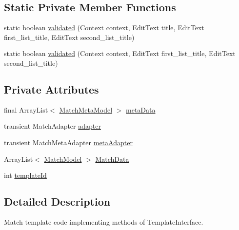 \subsection*{Static Private Member Functions}
\begin{DoxyCompactItemize}
\item 
static boolean \hyperlink{classorg_1_1buildmlearn_1_1toolkit_1_1templates_1_1MatchTemplate_aa835cc39ec0dbc77921db7111300ccc2}{validated} (Context context, Edit\+Text title, Edit\+Text first\+\_\+list\+\_\+title, Edit\+Text second\+\_\+list\+\_\+title)
\item 
static boolean \hyperlink{classorg_1_1buildmlearn_1_1toolkit_1_1templates_1_1MatchTemplate_a32ea6e549a58031b4ef778f45fa3dd0d}{validated} (Context context, Edit\+Text first\+\_\+list\+\_\+title, Edit\+Text second\+\_\+list\+\_\+title)
\end{DoxyCompactItemize}
\subsection*{Private Attributes}
\begin{DoxyCompactItemize}
\item 
final Array\+List$<$ \hyperlink{classorg_1_1buildmlearn_1_1toolkit_1_1templates_1_1MatchMetaModel}{Match\+Meta\+Model} $>$ \hyperlink{classorg_1_1buildmlearn_1_1toolkit_1_1templates_1_1MatchTemplate_a5c473fec959674567ce8c75964c9ff60}{meta\+Data}
\item 
transient Match\+Adapter \hyperlink{classorg_1_1buildmlearn_1_1toolkit_1_1templates_1_1MatchTemplate_a03ac5cd114e8631b9705cff325ee5c9b}{adapter}
\item 
transient Match\+Meta\+Adapter \hyperlink{classorg_1_1buildmlearn_1_1toolkit_1_1templates_1_1MatchTemplate_afe51cede6dfe764bfbfd8669813105b3}{meta\+Adapter}
\item 
Array\+List$<$ \hyperlink{classorg_1_1buildmlearn_1_1toolkit_1_1templates_1_1MatchModel}{Match\+Model} $>$ \hyperlink{classorg_1_1buildmlearn_1_1toolkit_1_1templates_1_1MatchTemplate_a80bd8a5aeaca0989e1e685c28dc20d5b}{Match\+Data}
\item 
int \hyperlink{classorg_1_1buildmlearn_1_1toolkit_1_1templates_1_1MatchTemplate_a2e7eea6a94cc7e7c08e4db7dc31d4a7c}{template\+Id}
\end{DoxyCompactItemize}


\subsection{Detailed Description}
Match template code implementing methods of Template\+Interface. 

